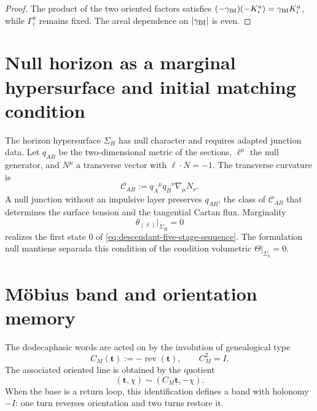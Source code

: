 \begin{proof}
The product of the two oriented factors satisfies
\((-\gamma_{\rm BI})(-K_i^a)=\gamma_{\rm BI}K_i^a\), while \(\Gamma_i^a\)
remains fixed. The areal dependence on \(|\gamma_{\rm BI}|\) is even.
\end{proof}

\section{Null horizon as a marginal hypersurface and initial matching condition}

The horizon hypersurface \(\Sigma_H\) has null character and requires
adapted junction data. Let \(q_{AB}\) be the two-dimensional metric of the
sections, \(\ell^\mu\) the null generator, and \(N^\mu\) a transverse vector with
\(\ell\cdot N=-1\). The transverse curvature is
\begin{equation}
 \mathcal C_{AB}
 :=q_A{}^\mu q_B{}^\nu\nabla_\mu N_\nu.
 \label{eq:descendant-null-transverse-curvature}
\end{equation}
A null junction without an impulsive layer preserves \(q_{AB}\), the class of
\(\mathcal C_{AB}\) that determines the surface tension and the tangential
Cartan flux. Marginality
\begin{equation}
 \theta_{(\ell)}\big|_{\Sigma_H}=0
 \label{eq:descendant-null-marginality}
\end{equation}
realizes the first state \(0\) of
\cref{eq:descendant-five-stage-sequence}. The formulation null mantiene
separada this condition of the condition volumetric
\(\Theta|_{\Sigma_b}=0\).

\section{Möbius band and orientation memory}

The dodecaphasic words are acted on by the involution of genealogical type
\begin{equation}
 C_M(\mathbf t):=-\operatorname{rev}(\mathbf t),
 \qquad
 C_M^2=I.
 \label{eq:descendant-CM}
\end{equation}
The associated oriented line is obtained by the quotient
\begin{equation}
 (\mathbf t,\chi)\sim(C_M\mathbf t,-\chi).
 \label{eq:descendant-Mobius-quotient}
\end{equation}
When the base is a return loop, this identification defines a band
with holonomy \(-I\): one turn reverses orientation and two turns
restore it.

